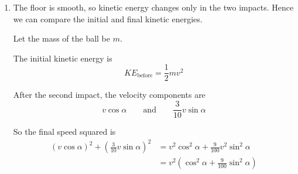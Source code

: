 \documentclass[leqno]{article}
\begin{document}
\begin{enumerate}[
  label=\textbf{\arabic*.},
  leftmargin=*,
  topsep=0pt,
  partopsep=0pt,
  parsep=0pt
]
\begin{djsSolution}
\begin{enumerate}[label=\textbf{(\alph*)}]
  The wall \(CD\) is smooth, so the component of velocity parallel to the wall is unchanged, and the component perpendicular to the wall is reversed and multiplied by \(\frac12\).

  So after impact with \(CD\) the perpendicular component becomes
  \[
  \frac12\left(\frac35 v\sin\alpha\right)=\frac3{10}v\sin\alpha
  \]

  So after the second impact the components are
  \[
  \text{parallel to }CD: \ v\cos\alpha,
  \qquad
  \text{perpendicular to }CD: \ \frac3{10}v\sin\alpha
  \]

  We are told that after this impact the ball moves at angle \(\frac\pi4-\alpha\) to \(CD\), so
  \begin{align*}
  \tan\left(\frac\pi4-\alpha\right)
  &= \frac{\frac3{10}v\sin\alpha}{v\cos\alpha} \\
  &= \frac3{10}\tan\alpha
  \end{align*}

  Let \(t=\tan\alpha\). Using
  \[
  \tan\left(\frac\pi4-\alpha\right)=\frac{1-t}{1+t}
  \]

  we get
  \begin{align*}
  \frac{1-t}{1+t} &= \frac{3t}{10} \\
  10(1-t) &= 3t(1+t) \\
  10-10t &= 3t+3t^2 \\
  3t^2+13t-10 &= 0 \\
  (3t-2)(t+5) &= 0
  \end{align*}

  So
  \[
  t=\frac23 \quad \text{or} \quad t=-5
  \]

  But \(0<\alpha<\frac\pi4\), so \(0<\tan\alpha<1\). Hence \(t=-5\) is impossible.

  Therefore
  \[
  \tan\alpha=\frac23
  \]

  \item The floor is smooth, so kinetic energy changes only in the two impacts. Hence we can compare the initial and final kinetic energies.

  Let the mass of the ball be \(m\).

  The initial kinetic energy is
  \[
  KE_{\text{before}}=\frac12 mv^2
  \]

  After the second impact, the velocity components are
  \[
  v\cos\alpha
  \qquad \text{and} \qquad
  \frac3{10}v\sin\alpha
  \]

  So the final speed squared is
  \begin{align*}
  \left(v\cos\alpha\right)^2+\left(\frac3{10}v\sin\alpha\right)^2
  &= v^2\cos^2\alpha+\frac9{100}v^2\sin^2\alpha \\
  &= v^2\left(\cos^2\alpha+\frac9{100}\sin^2\alpha\right)
  \end{align*}


\end{enumerate}
\end{djsSolution}
\end{enumerate}
\end{document}
